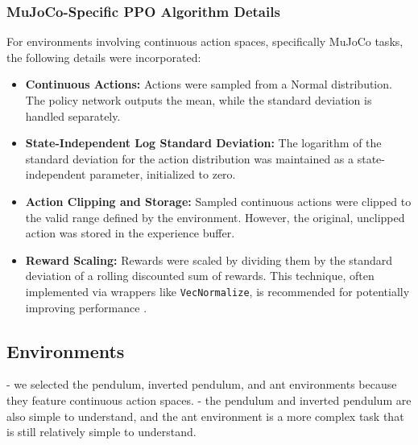 \documentclass{article}
\begin{document}
\subsubsection{MuJoCo-Specific PPO Algorithm Details}
For environments involving continuous action spaces, specifically MuJoCo tasks, the following details were incorporated:
\begin{itemize}
    \item \textbf{Continuous Actions:} Actions were sampled from a Normal distribution. The policy network outputs the mean, while the standard deviation is handled separately.
    \item \textbf{State-Independent Log Standard Deviation:} The logarithm of the standard deviation for the action distribution was maintained as a state-independent parameter, initialized to zero.
    \item \textbf{Action Clipping and Storage:} Sampled continuous actions were clipped to the valid range defined by the environment. However, the original, unclipped action was stored in the experience buffer.
    \item \textbf{Reward Scaling:} Rewards were scaled by dividing them by the standard deviation of a rolling discounted sum of rewards. This technique, often implemented via wrappers like \texttt{VecNormalize}, is recommended for potentially improving performance \cite{Engstrom2020Implementation}.
\end{itemize}

\subsection{Environments}
- we selected the pendulum, inverted pendulum, and ant environments because they feature continuous action spaces.
- the pendulum and inverted pendulum are also simple to understand, and the ant environment is a more complex task that is still relatively simple to understand.
\end{document}
